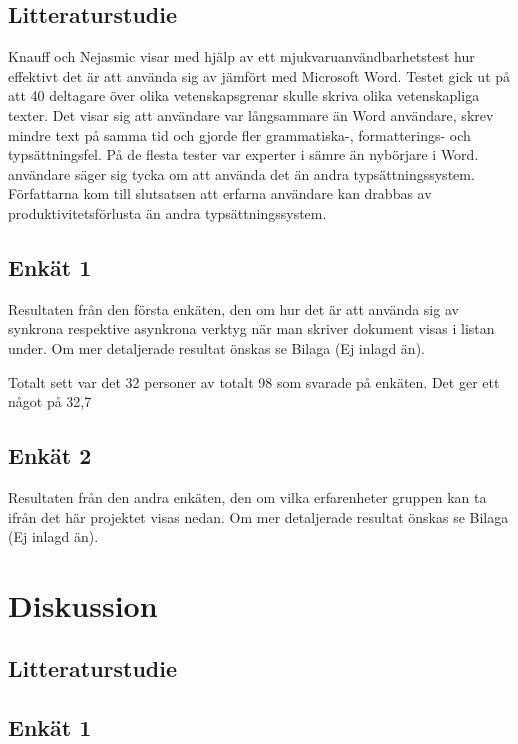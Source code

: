 \subsection{Litteraturstudie}
Knauff och Nejasmic \cite{knauff2014efficiency} visar med hjälp av ett mjukvaruanvändbarhetstest hur effektivt det är att använda sig av \latex jämfört med Microsoft Word. Testet gick ut på att 40 deltagare över olika vetenskapsgrenar skulle skriva olika vetenskapliga texter.
Det visar sig att \latex användare var långsammare än Word användare, skrev mindre text på samma tid och gjorde fler grammatiska-, formatterings- och typsättningsfel. På de flesta tester var experter i \latex sämre än nybörjare i Word. \latex användare säger sig tycka om att använda det än andra typsättningssystem. Författarna kom till slutsatsen att erfarna \latex användare kan drabbas av produktivitetsförlusta än andra typsättningssystem.



\subsection{Enkät 1}
Resultaten från den första enkäten, den om hur det är att använda sig av synkrona respektive asynkrona verktyg när man skriver dokument visas i listan under. Om mer detaljerade resultat önskas se Bilaga (Ej inlagd än).

Totalt sett var det 32 personer av totalt 98 som svarade på enkäten. Det ger ett något på 32,7%

\subsection{Enkät 2}
Resultaten från den andra enkäten, den om vilka erfarenheter gruppen kan ta ifrån det här projektet visas nedan. Om mer detaljerade resultat önskas se Bilaga (Ej inlagd än).

\section{Diskussion}
\label{sec:discussion-tuhkala}

\subsection{Litteraturstudie}

\subsection{Enkät 1}

